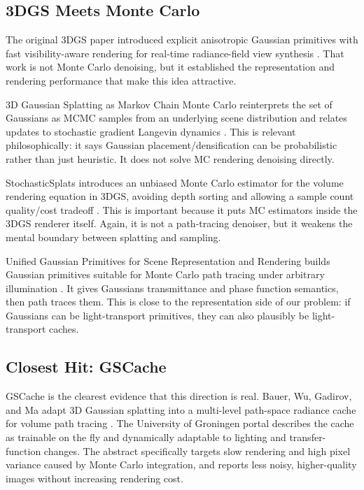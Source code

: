 \documentclass[11pt]{article}
\begin{document}
\subsection{3DGS Meets Monte Carlo}

The original 3DGS paper introduced explicit anisotropic Gaussian primitives
with fast visibility-aware rendering for real-time radiance-field view synthesis
\cite{kerbl2023gs}. That work is not Monte Carlo denoising, but it established
the representation and rendering performance that make this idea attractive.

3D Gaussian Splatting as Markov Chain Monte Carlo reinterprets the set of
Gaussians as MCMC samples from an underlying scene distribution and relates
updates to stochastic gradient Langevin dynamics \cite{kheradmand2024mcmc}.
This is relevant philosophically: it says Gaussian placement/densification can
be probabilistic rather than just heuristic. It does not solve MC rendering
denoising directly.

StochasticSplats introduces an unbiased Monte Carlo estimator for the volume
rendering equation in 3DGS, avoiding depth sorting and allowing a sample count
quality/cost tradeoff \cite{kheradmand2025stochasticsplats}. This is important
because it puts MC estimators inside the 3DGS renderer itself. Again, it is not
a path-tracing denoiser, but it weakens the mental boundary between splatting
and sampling.

Unified Gaussian Primitives for Scene Representation and Rendering builds
Gaussian primitives suitable for Monte Carlo path tracing under arbitrary
illumination \cite{zhou2024unified}. It gives Gaussians transmittance and phase
function semantics, then path traces them. This is close to the representation
side of our problem: if Gaussians can be light-transport primitives, they can
also plausibly be light-transport caches.

\subsection{Closest Hit: GSCache}

GSCache is the clearest evidence that this direction is real. Bauer, Wu,
Gadirov, and Ma adapt 3D Gaussian splatting into a multi-level path-space
radiance cache for volume path tracing \cite{bauer2026gscache}. The University
of Groningen portal describes the cache as trainable on the fly and dynamically
adaptable to lighting and transfer-function changes. The abstract specifically
targets slow rendering and high pixel variance caused by Monte Carlo
integration, and reports less noisy, higher-quality images without increasing
rendering cost.
\end{document}
